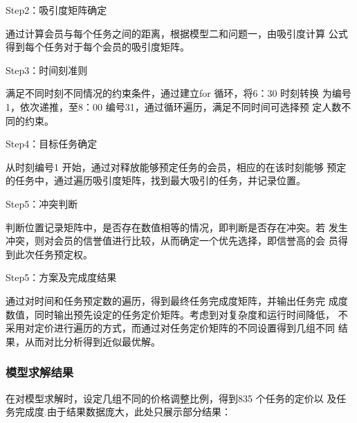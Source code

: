 Step2：吸引度矩阵确定

通过计算会员与每个任务之间的距离，根据模型二和问题一，由吸引度计算
公式得到每个任务对于每个会员的吸引度矩阵。

Step3：时间刻准则

满足不同时刻不同情况的约束条件，通过建立for 循环，将6：30 时刻转换
为编号1，依次递推，至8：00 编号31，通过循环遍历，满足不同时间可选择预
定人数不同的约束。

Step4：目标任务确定

从时刻编号1 开始，通过对释放能够预定任务的会员，相应的在该时刻能够
预定的任务中，通过遍历吸引度矩阵，找到最大吸引的任务，并记录位置。

Step5：冲突判断

判断位置记录矩阵中，是否存在数值相等的情况，即判断是否存在冲突。若
发生冲突，则对会员的信誉值进行比较，从而确定一个优先选择，即信誉高的会
员得到此次任务预定权。

Step5：方案及完成度结果

通过对时间和任务预定数的遍历，得到最终任务完成度矩阵，并输出任务完
成度数值，同时输出预先设定的任务定价矩阵。考虑到对复杂度和运行时间降低，
不采用对定价进行遍历的方式，而通过对任务定价矩阵的不同设置得到几组不同
结果，从而对比分析得到近似最优解。

\subsubsection{模型求解结果}
在对模型求解时，设定几组不同的价格调整比例，得到835 个任务的定价以
及任务完成度.由于结果数据庞大，此处只展示部分结果：

